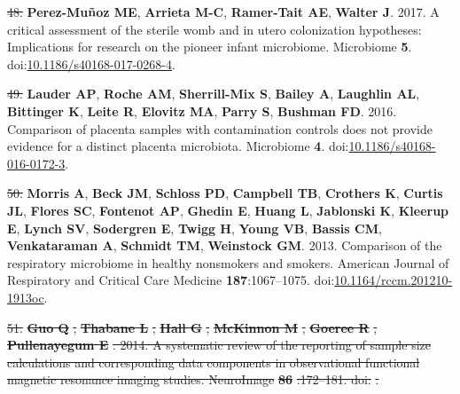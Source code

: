 \documentclass[]{article}
\providecommand{\DIFaddtex}[1]{{\protect\color{blue}\uwave{#1}}} %
\providecommand{\DIFdeltex}[1]{{\protect\color{red}\sout{#1}}}                      %
\providecommand{\DIFaddbegin}{} %
\providecommand{\DIFaddend}{} %
\providecommand{\DIFdelbegin}{} %
\providecommand{\DIFdelend}{} %
\providecommand{\DIFadd}[1]{\texorpdfstring{\DIFaddtex{#1}}{#1}} %
\providecommand{\DIFdel}[1]{\texorpdfstring{\DIFdeltex{#1}}{}} %
\begin{document}
\hypertarget{ref-PerezMuoz2017}{}
\DIFdelbegin \DIFdel{48. }\DIFdelend \DIFaddbegin \DIFadd{54. }\DIFaddend \textbf{Perez-Muñoz ME}, \textbf{Arrieta M-C}, \textbf{Ramer-Tait
AE}, \textbf{Walter J}. 2017. A critical assessment of the sterile womb
and in utero colonization hypotheses: Implications for research on the
pioneer infant microbiome. Microbiome \textbf{5}.
doi:\href{https://doi.org/10.1186/s40168-017-0268-4}{10.1186/s40168-017-0268-4}.

\hypertarget{ref-Lauder2016}{}
\DIFdelbegin \DIFdel{49. }\DIFdelend \DIFaddbegin \DIFadd{55. }\DIFaddend \textbf{Lauder AP}, \textbf{Roche AM}, \textbf{Sherrill-Mix S},
\textbf{Bailey A}, \textbf{Laughlin AL}, \textbf{Bittinger K},
\textbf{Leite R}, \textbf{Elovitz MA}, \textbf{Parry S}, \textbf{Bushman
FD}. 2016. Comparison of placenta samples with contamination controls
does not provide evidence for a distinct placenta microbiota. Microbiome
\textbf{4}.
doi:\href{https://doi.org/10.1186/s40168-016-0172-3}{10.1186/s40168-016-0172-3}.

\hypertarget{ref-Morris2013}{}
\DIFdelbegin \DIFdel{50. }\DIFdelend \DIFaddbegin \DIFadd{56. }\DIFaddend \textbf{Morris A}, \textbf{Beck JM}, \textbf{Schloss PD},
\textbf{Campbell TB}, \textbf{Crothers K}, \textbf{Curtis JL},
\textbf{Flores SC}, \textbf{Fontenot AP}, \textbf{Ghedin E},
\textbf{Huang L}, \textbf{Jablonski K}, \textbf{Kleerup E},
\textbf{Lynch SV}, \textbf{Sodergren E}, \textbf{Twigg H}, \textbf{Young
VB}, \textbf{Bassis CM}, \textbf{Venkataraman A}, \textbf{Schmidt TM},
\textbf{Weinstock GM}. 2013. Comparison of the respiratory microbiome in
healthy nonsmokers and smokers. American Journal of Respiratory and
Critical Care Medicine \textbf{187}:1067--1075.
doi:\href{https://doi.org/10.1164/rccm.201210-1913oc}{10.1164/rccm.201210-1913oc}.

\DIFdelbegin %
\DIFdel{51. }\textbf{\DIFdel{Guo Q}}%
\DIFdel{, }\textbf{\DIFdel{Thabane L}}%
\DIFdel{, }\textbf{\DIFdel{Hall G}}%
\DIFdel{,
}\textbf{\DIFdel{McKinnon M}}%
\DIFdel{, }\textbf{\DIFdel{Goeree R}}%
\DIFdel{, }\textbf{\DIFdel{Pullenayegum E}}%
\DIFdel{. 2014. A
systematic review of the reporting of sample size calculations and
corresponding data components in observational functional magnetic
resonance imaging studies. NeuroImage }\textbf{\DIFdel{86}}%
\DIFdel{:172--181.
doi:}%
\DIFdel{.
}%
\end{document}
